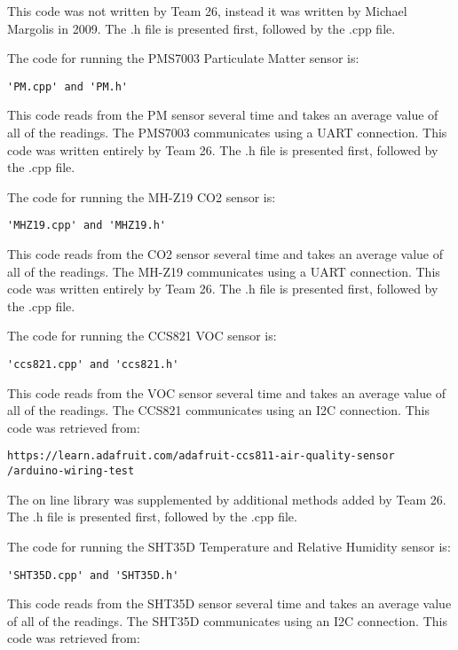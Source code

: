 \documentclass[12pt,letterpaper,titlepage]{article}
\begin{document}
This code was not written by Team 26, instead it was written by Michael Margolis in 2009. The .h file is presented first, followed by the .cpp file.


The code for running the PMS7003 Particulate Matter sensor is:
\begin{verbatim}
'PM.cpp' and 'PM.h'
\end{verbatim}
This code reads from the PM sensor several time and takes an average value of all of the readings. The PMS7003 communicates using a UART connection. This code was written entirely by Team 26. The .h file is presented first, followed by the .cpp file.


The code for running the MH-Z19 CO2 sensor is:
\begin{verbatim}
'MHZ19.cpp' and 'MHZ19.h'
\end{verbatim}
This code reads from the CO2 sensor several time and takes an average value of all of the readings. The MH-Z19 communicates using a UART connection. This code was written entirely by Team 26. The .h file is presented first, followed by the .cpp file.


The code for running the CCS821 VOC sensor is:
\begin{verbatim}
'ccs821.cpp' and 'ccs821.h'
\end{verbatim}
This code reads from the VOC sensor several time and takes an average value of all of the readings. The CCS821 communicates using an I2C connection. This code was retrieved from:
\begin{verbatim}
https://learn.adafruit.com/adafruit-ccs811-air-quality-sensor
/arduino-wiring-test
\end{verbatim}
The on line library was supplemented by additional methods added by Team 26. The .h file is presented first, followed by the .cpp file.


The code for running the SHT35D Temperature and Relative Humidity sensor is:
\begin{verbatim}
'SHT35D.cpp' and 'SHT35D.h'
\end{verbatim}
This code reads from the SHT35D sensor several time and takes an average value of all of the readings. The SHT35D communicates using an I2C connection. This code was retrieved from:
\end{document}
